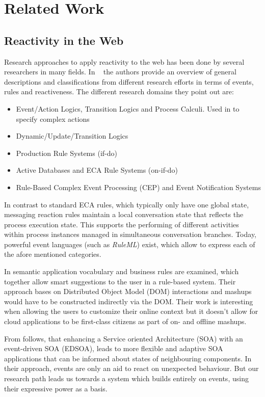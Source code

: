 \documentclass[11pt]{article}%
\begin{document}
\section{Related Work}
\subsection{Reactivity in the Web}
Research approaches to apply reactivity to the web has been done by several researchers in many fields.
In ~\cite{2009-Paschke_Boley-RCER.pdf} the authors provide an overview of general descriptions and classifications from different research efforts in terms of events, rules and reactiveness. The different research domains they point out are:
 \begin{itemize}
  \item Event/Action Logics, Transition Logics and Process Calculi. Used in \cite{Behrends:2008:EEA:1377798.1377801} to specify complex actions
  \item Dynamic/Update/Transition Logics
  \item Production Rule Systems (if-do)
  \item Active Databases and ECA Rule Systems (on-if-do)
  \item Rule-Based Complex Event Processing (CEP) and Event Notification Systems
\end{itemize}
In contrast to standard ECA rules, which typically only have one global state, messaging reaction rules maintain a local conversation state that reflects the process execution state. This supports the performing of different activities within process instances managed in simultaneous conversation branches. Today, powerful event languages (such as \emph{RuleML}) exist, which allow to express each of the afore mentioned categories.

In \cite{2012-Giurca_etal-RuleTheWeb.pdf} semantic application vocabulary and business rules are examined, which together allow smart suggestions to the user in a rule-based system. Their approach bases on Distributed Object Model (DOM) interactions and mashups would have to be constructed indirectly via the DOM. Their work is interesting when allowing the users to customize their online context but it doesn't allow for cloud applications to be first-class citizens as part of on- and offline mashups.

From \cite{2010-Ye_Jacobsen-EEWS.pdf} follows, that enhancing a Service oriented Architecture (SOA) with an event-driven SOA (EDSOA), leads to more flexible and adaptive SOA applications that can be informed about states of neighbouring components. In their approach, events are only an aid to react on unexpected behaviour. But our research path leads us towards a system which builds entirely on events, using their expressive power as a basis.
\end{document}
